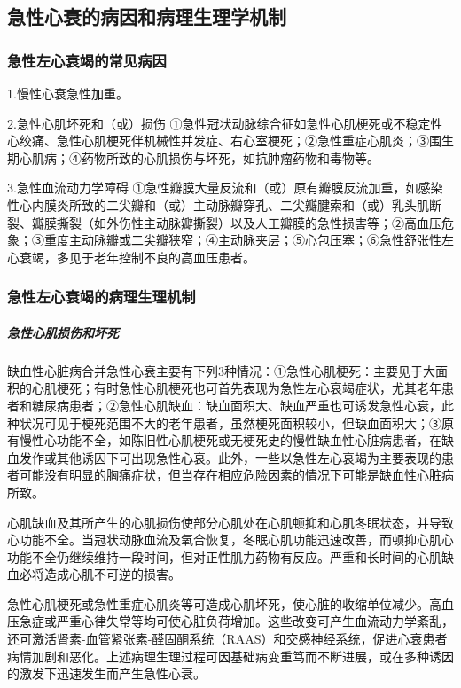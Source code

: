 \subsection{急性心衰的病因和病理生理学机制}

\subsubsection{急性左心衰竭的常见病因}

1.慢性心衰急性加重。

2.急性心肌坏死和（或）损伤
①急性冠状动脉综合征如急性心肌梗死或不稳定性心绞痛、急性心肌梗死伴机械性并发症、右心室梗死；②急性重症心肌炎；③围生期心肌病；④药物所致的心肌损伤与坏死，如抗肿瘤药物和毒物等。

3.急性血流动力学障碍
①急性瓣膜大量反流和（或）原有瓣膜反流加重，如感染性心内膜炎所致的二尖瓣和（或）主动脉瓣穿孔、二尖瓣腱索和（或）乳头肌断裂、瓣膜撕裂（如外伤性主动脉瓣撕裂）以及人工瓣膜的急性损害等；②高血压危象；③重度主动脉瓣或二尖瓣狭窄；④主动脉夹层；⑤心包压塞；⑥急性舒张性左心衰竭，多见于老年控制不良的高血压患者。

\subsubsection{急性左心衰竭的病理生理机制}

\subparagraph{急性心肌损伤和坏死}

缺血性心脏病合并急性心衰主要有下列3种情况：①急性心肌梗死：主要见于大面积的心肌梗死；有时急性心肌梗死也可首先表现为急性左心衰竭症状，尤其老年患者和糖尿病患者；②急性心肌缺血：缺血面积大、缺血严重也可诱发急性心衰，此种状况可见于梗死范围不大的老年患者，虽然梗死面积较小，但缺血面积大；③原有慢性心功能不全，如陈旧性心肌梗死或无梗死史的慢性缺血性心脏病患者，在缺血发作或其他诱因下可出现急性心衰。此外，一些以急性左心衰竭为主要表现的患者可能没有明显的胸痛症状，但当存在相应危险因素的情况下可能是缺血性心脏病所致。

心肌缺血及其所产生的心肌损伤使部分心肌处在心肌顿抑和心肌冬眠状态，并导致心功能不全。当冠状动脉血流及氧合恢复，冬眠心肌功能迅速改善，而顿抑心肌心功能不全仍继续维持一段时间，但对正性肌力药物有反应。严重和长时间的心肌缺血必将造成心肌不可逆的损害。

急性心肌梗死或急性重症心肌炎等可造成心肌坏死，使心脏的收缩单位减少。高血压急症或严重心律失常等均可使心脏负荷增加。这些改变可产生血流动力学紊乱，还可激活肾素-血管紧张素-醛固酮系统（RAAS）和交感神经系统，促进心衰患者病情加剧和恶化。上述病理生理过程可因基础病变重笃而不断进展，或在多种诱因的激发下迅速发生而产生急性心衰。


